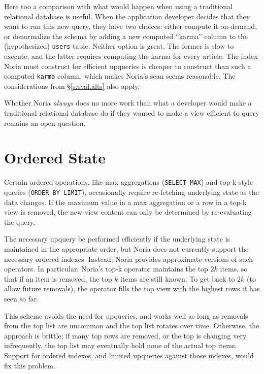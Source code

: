Here too a comparison with what would happen when using a traditional relational
database is useful. When the application developer decides that they want to run
this new query, they have two choices: either compute it on-demand, or
denormalize the schema by adding a new computed ``karma'' column to the
(hypothesized) \texttt{users} table. Neither option is great. The former is slow
to execute, and the latter requires computing the karma for every article.
The index Noria must construct for efficient upqueries is cheaper to construct
than such a computed \texttt{karma} column, which makes Noria's scan seems
reasonable. The considerations from \S\ref{s:eval:alts} also apply.


Whether Noria \emph{always} does no more work than what a developer would
make a traditional relational database do if they wanted to make a view
efficient to query remains an open question.

\section{Ordered State}
\label{s:disc:ordered}

Certain ordered operations, like max aggregations (\texttt{SELECT MAX}) and
top-k-style queries (\texttt{ORDER BY LIMIT}), occasionally require re-fetching
underlying state as the data changes. If the maximum value in a max aggregation
or a row in a top-k view is removed, the new view content can only be determined
by re-evaluating the query.

The necessary upquery be performed efficiently if the underlying state is
maintained in the appropriate order, but Noria does not currently support the
necessary ordered indexes. Instead, Noria provides approximate versions of such
operators. In particular, Noria's top-k operator maintains the top $2k$ items,
so that if an item is removed, the top $k$ items are still known. To get back to
$2k$ (to allow future removals), the operator fills the top view with the
highest rows it has seen so far.

This scheme avoids the need for upqueries, and works well as long as removals
from the top list are uncommon and the top list rotates over time. Otherwise,
the approach is brittle; if many top rows are removed, or the top is changing
very infrequently, the top list may eventually hold none of the actual top
items. Support for ordered indexes, and limited upqueries against those indexes,
would fix this problem.

